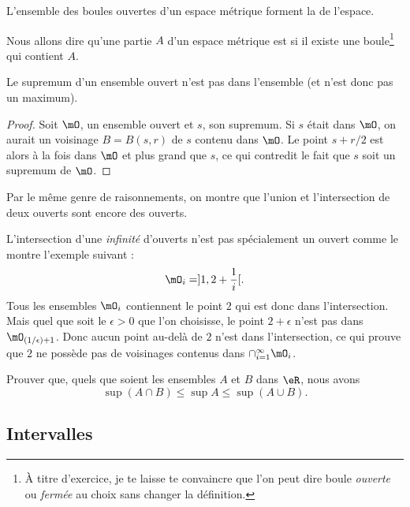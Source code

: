 \begin{definition}
L'ensemble des boules ouvertes d'un espace métrique forment la  de l'espace.
\end{definition}

Nous allons dire qu'une partie $A$ d'un espace métrique est  si il existe une boule\footnote{À titre d'exercice, je te laisse te convaincre que l'on peut dire boule \emph{ouverte} ou \emph{fermée} au choix sans changer la définition.} qui contient $A$.

\begin{lemma}  \label{LemSupOuvPas}
Le supremum d'un ensemble ouvert n'est pas dans l'ensemble (et n'est donc pas un maximum).
\end{lemma}

\begin{proof}
Soit $\mO$, un ensemble ouvert et $s$, son supremum. Si $s$ était dans $\mO$, on aurait un voisinage $B=B(s,r)$ de $s$ contenu dans $\mO$. Le point $s+r/2$ est alors à la fois dans $\mO$ et plus grand que $s$, ce qui contredit le fait que $s$ soit un supremum de $\mO$.
\end{proof}

Par le même genre de raisonnements, on montre que l'union et l'intersection de deux ouverts sont encore des ouverts.

\begin{remark}
L'intersection d'une \emph{infinité} d'ouverts n'est pas spécialement un ouvert comme le montre l'exemple suivant :
\[ 
  \mO_i=]1,2+\frac{ 1 }{ i }[.
\]
Tous les ensembles $\mO_i$ contiennent le point $2$ qui est donc dans l'intersection. Mais quel que soit le $\epsilon>0$ que l'on choisisse, le point $2+\epsilon$ n'est pas dans $\mO_{(1/\epsilon)+1}$. Donc aucun point au-delà de $2$ n'est dans l'intersection, ce qui prouve que $2$ ne possède pas de voisinages contenus dans $\cap_{i=1}^{\infty}\mO_i$.
\end{remark}

\begin{proposition}
Prouver que, quels que soient les ensembles $A$ et $B$ dans $\eR$, nous avons
\[ 
  \sup(A\cap B)\leq\sup A\leq\sup(A\cup B).
\]
\end{proposition}

\subsection{Intervalles}

